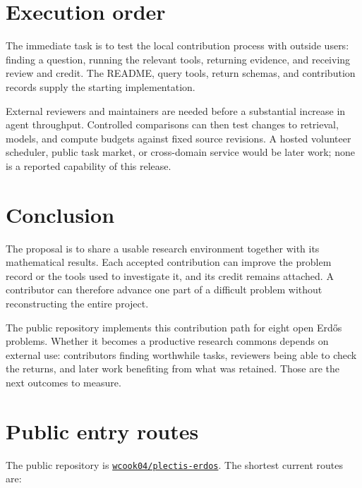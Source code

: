 \documentclass[10pt]{article}
\newcommand{\repobase}{https://github.com/wcook04/plectis-erdos}
\begin{document}
\section{Execution order}\label{sec:execution}

The immediate task is to test the local contribution process with outside
users: finding a question, running the relevant tools, returning evidence, and
receiving review and credit. The README, query tools, return schemas, and
contribution records supply the starting implementation.

External reviewers and maintainers are needed before a substantial increase
in agent throughput. Controlled comparisons can then test changes to retrieval,
models, and compute budgets against fixed source revisions. A hosted volunteer
scheduler, public task market, or cross-domain service would be later work;
none is a reported capability of this release.

\section{Conclusion}\label{sec:conclusion}

The proposal is to share a usable research environment together with its
mathematical results. Each accepted contribution can improve the problem
record or the tools used to investigate it, and its credit remains attached.
A contributor can therefore advance one part of a difficult problem without
reconstructing the entire project.

The public repository implements this contribution path for eight open
Erd\H{o}s problems. Whether it becomes a productive research commons depends on
external use: contributors finding worthwhile tasks, reviewers being able to
check the returns, and later work benefiting from what was retained. Those are
the next outcomes to measure.

\appendix
\section{Public entry routes}\label{app:routes}

The public repository is \href{\repobase}{\texttt{wcook04/plectis-erdos}}.
The shortest current routes are:
\end{document}
